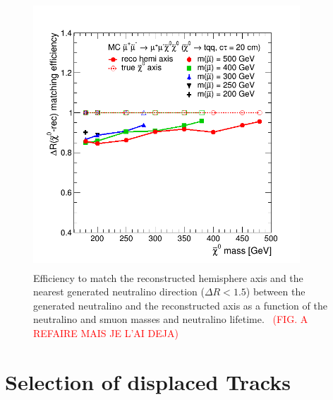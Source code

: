 \documentclass{cernatlasnote}
\begin{document}


\begin{figure}[h]
\centering
\includegraphics[height=10cm, width=10cm, trim= 0cm 0cm 0cm 0.cm,clip]{images/Topology/eff_dR_trueaxis.png}
\caption{\label{fig:AXESQUALITY} Efficiency to match the reconstructed hemisphere axis and the nearest generated neutralino direction ($\Delta R < 1.5$) between the generated neutralino and the reconstructed axis as a function of the neutralino and smuon masses and neutralino lifetime.
~\textcolor{red}{(FIG. A REFAIRE MAIS JE L'AI DEJA)} 
}
\end{figure}

\FloatBarrier
\newpage
\section{Selection of displaced Tracks}
\label{SEC: DISTRK}
    
\end{document}
